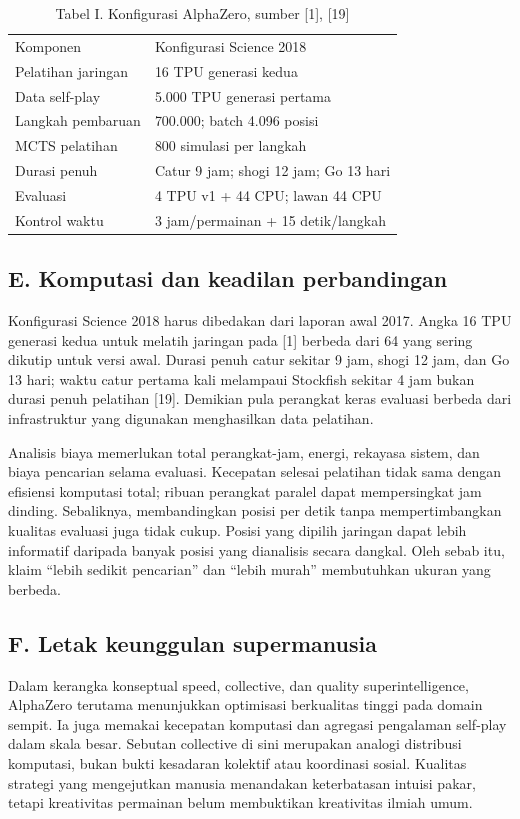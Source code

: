\documentclass[conference,a4paper]{IEEEtran}
\begin{document}
\begin{table}[ht]\caption{Tabel I. Konfigurasi AlphaZero, sumber [1], [19]}\centering\scriptsize\begin{tabular}{p{}p{}}\hline
Komponen & Konfigurasi Science 2018\\
Pelatihan jaringan & 16 TPU generasi kedua\\
Data self-play & 5.000 TPU generasi pertama\\
Langkah pembaruan & 700.000; batch 4.096 posisi\\
MCTS pelatihan & 800 simulasi per langkah\\
Durasi penuh & Catur 9 jam; shogi 12 jam; Go 13 hari\\
Evaluasi & 4 TPU v1 + 44 CPU; lawan 44 CPU\\
Kontrol waktu & 3 jam/permainan + 15 detik/langkah\\\hline\end{tabular}\end{table}
\subsection*{E. Komputasi dan keadilan perbandingan}
Konfigurasi Science 2018 harus dibedakan dari laporan awal 2017. Angka 16 TPU generasi kedua untuk melatih jaringan pada [1] berbeda dari 64 yang sering dikutip untuk versi awal. Durasi penuh catur sekitar 9 jam, shogi 12 jam, dan Go 13 hari; waktu catur pertama kali melampaui Stockfish sekitar 4 jam bukan durasi penuh pelatihan [19]. Demikian pula perangkat keras evaluasi berbeda dari infrastruktur yang digunakan menghasilkan data pelatihan.

Analisis biaya memerlukan total perangkat-jam, energi, rekayasa sistem, dan biaya pencarian selama evaluasi. Kecepatan selesai pelatihan tidak sama dengan efisiensi komputasi total; ribuan perangkat paralel dapat mempersingkat jam dinding. Sebaliknya, membandingkan posisi per detik tanpa mempertimbangkan kualitas evaluasi juga tidak cukup. Posisi yang dipilih jaringan dapat lebih informatif daripada banyak posisi yang dianalisis secara dangkal. Oleh sebab itu, klaim ``lebih sedikit pencarian'' dan ``lebih murah'' membutuhkan ukuran yang berbeda.

\subsection*{F. Letak keunggulan supermanusia}
Dalam kerangka konseptual speed, collective, dan quality superintelligence, AlphaZero terutama menunjukkan optimisasi berkualitas tinggi pada domain sempit. Ia juga memakai kecepatan komputasi dan agregasi pengalaman self-play dalam skala besar. Sebutan collective di sini merupakan analogi distribusi komputasi, bukan bukti kesadaran kolektif atau koordinasi sosial. Kualitas strategi yang mengejutkan manusia menandakan keterbatasan intuisi pakar, tetapi kreativitas permainan belum membuktikan kreativitas ilmiah umum.
\end{document}
